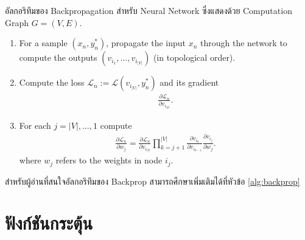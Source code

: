 \begin{algorithm}[ht]
    \caption{อัลกอริทึมของ Backpropagation สำหรับ Neural Network ซึ่งแสดงด้วย Computation Graph $G = (V,E)$.}
    \label{alg:backprop}
    \begin{enumerate}
        \item For a sample $(x_n ,y^*_n)$, propagate the input $x_n$ through the
              network to compute the outputs $(v_{i_1}, \ldots, v_{i_{|V|}})$ (in topological order).

        \item Compute the loss $\mathcal{L}_n := \mathcal{L}(v_{i_{|V|}}, y_n^*)$
              and its gradient
              \begin{align}
                  \frac{\partial \mathcal{L}_n}{\partial v_{i_{|V|}}}.
              \end{align}

        \item For each $j = |V|,\ldots,1$ compute
              \begin{align}
                  \frac{\partial \mathcal{L}_n}{\partial w_j} =
                  \frac{\partial \mathcal{L}_n}{\partial v_{i_{|V|}}} \prod_{k = j + 1}^{|V|}
                  \frac{\partial v_{i_k}}{\partial v_{i_{k - 1}}}
                  \frac{\partial v_{i_j}}{\partial w_j}.
              \end{align}
              where $w_j$ refers to the weights in node $i_j$.
    \end{enumerate}
\end{algorithm}

สำหรับผู้อ่านที่สนใจอัลกอริทึมของ Backprop สามารถศึกษาเพิ่มเติมได้ที่หัวข้อ \ref{alg:backprop}

\section{ฟังก์ชันกระตุ้น}
\label{sec:act_func}

